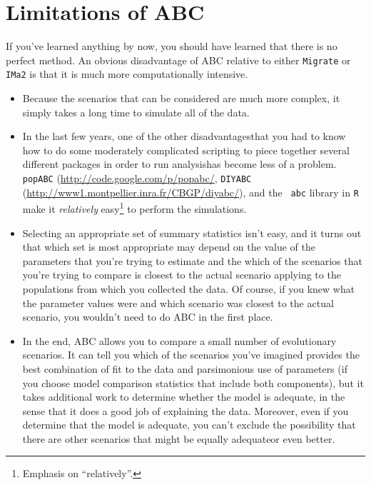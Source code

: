 \documentclass[12pt]{article}
\begin{document}
\section*{Limitations of ABC}

If you've learned anything by now, you should have learned that there
is no perfect method. An obvious disadvantage of ABC relative to
either {\tt Migrate} or {\tt IMa2} is that it is much more
computationally intensive. 

\begin{itemize}

\item Because the scenarios that can be considered are much more
  complex, it simply takes a long time to simulate all of the data. 

\item In the last few years, one of the other disadvantages{\dash}that
  you had to know how to do some moderately complicated scripting to
  piece together several different packages in order to run
  analysis{\dash}has become less of a problem. {\tt popABC}
  (\url{http://code.google.com/p/popabc/}, {\tt DIYABC}
  (\url{http://www1.montpellier.inra.fr/CBGP/diyabc/}), and the {\tt
    abc\/} library in {\tt R} make it {\it relatively\/}
  easy\footnote{Emphasis on ``relatively''.} to perform the
  simulations.

\item Selecting an appropriate set of summary statistics isn't easy,
  and it turns out that which set is most appropriate may depend on
  the value of the parameters that you're trying to estimate and the
  which of the scenarios that you're trying to compare is closest to
  the actual scenario applying to the populations from which you
  collected the data. Of course, if you knew what the parameter values
  were and which scenario was closest to the actual scenario, you
  wouldn't need to do ABC in the first place.

\item In the end, ABC allows you to compare a small number of
  evolutionary scenarios. It can tell you which of the scenarios
  you've imagined provides the best combination of fit to the data and
  parsimonious use of parameters (if you choose model comparison
  statistics that include both components), but it takes additional
  work to determine whether the model is adequate, in the sense that
  it does a good job of explaining the data. Moreover, even if you
  determine that the model is adequate, you can't exclude the
  possibility that there are other scenarios that might be equally
  adequate{\dash}or even better.

\end{itemize}




\ccLicense
\end{document}

